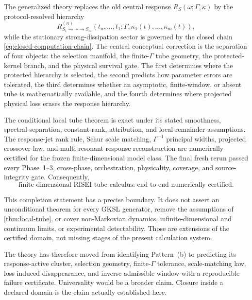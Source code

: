 \documentclass[11pt]{article}
\theoremstyle{definition}
\theoremstyle{remark}
\begin{document}
The generalized theory replaces the old central response $R_S(\omega;\Gamma,\kappa)$ by the protocol-resolved hierarchy
\begin{equation}
R_{S_1\rightarrow\cdots\rightarrow S_m}^{(n)}
\!\left(
 t_n,\ldots,t_1;
 \Gamma,
 \kappa_1(t),\ldots,\kappa_m(t)
\right),
\end{equation}
while the stationary strong-dissipation sector is governed by the closed chain \eqref{eq:closed-computation-chain}.  The central conceptual correction is the separation of four objects: the selection manifold, the finite-$\Gamma$ tube geometry, the protected-kernel branch, and the physical survival gate.  The first determines where the protected hierarchy is selected, the second predicts how parameter errors are tolerated, the third determines whether an asymptotic, finite-window, or absent tube is mathematically available, and the fourth determines where projected physical loss erases the response hierarchy.

The conditional local tube theorem is exact under its stated smoothness, spectral-separation, constant-rank, attribution, and local-remainder assumptions.  The response-jet rank rule, Schur scale matching, $\Gamma^{-1}$ principal widths, projected crossover law, and multi-resonant response reconstruction are numerically certified for the frozen finite-dimensional model class.  The final fresh rerun passed every Phase~1--3, cross-phase, orchestration, physicality, coverage, and source-integrity gate.  Consequently,
\begin{equation}
 \boxed{\text{finite-dimensional RISEI tube calculus:
 end-to-end numerically certified}.}
 \label{eq:final-completion-statement}
\end{equation}

This completion statement has a precise boundary.  It does not assert an unconditional theorem for every GKSL generator, remove the assumptions of \cref{thm:local-tube}, or cover non-Markovian dynamics, infinite-dimensional and continuum limits, or experimental detectability.  Those are extensions of the certified domain, not missing stages of the present calculation system.

The theory has therefore moved from identifying Pattern~(b) to predicting its response-active cluster, selection geometry, finite-$\Gamma$ tolerance, scale-matching law, loss-induced disappearance, and inverse admissible window with a reproducible failure certificate.  Universality would be a broader claim.  Closure inside a declared domain is the claim actually established here.
\end{document}
